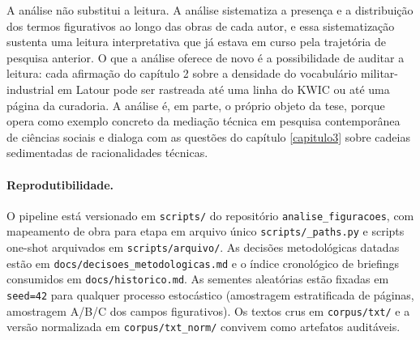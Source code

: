 A análise não substitui a leitura. A análise sistematiza a presença e a distribuição dos termos figurativos ao longo das obras de cada autor, e essa sistematização sustenta uma leitura interpretativa que já estava em curso pela trajetória de pesquisa anterior. O que a análise oferece de novo é a possibilidade de auditar a leitura: cada afirmação do capítulo 2 sobre a densidade do vocabulário militar-industrial em Latour pode ser rastreada até uma linha do KWIC ou até uma página da curadoria. A análise é, em parte, o próprio objeto da tese, porque opera como exemplo concreto da mediação técnica em pesquisa contemporânea de ciências sociais e dialoga com as questões do capítulo \ref{capitulo3} sobre cadeias sedimentadas de racionalidades técnicas.

\paragraph{Reprodutibilidade.} O pipeline está versionado em \texttt{scripts/} do repositório \texttt{analise\_figuracoes}, com mapeamento de obra para etapa em arquivo único \texttt{scripts/\_paths.py} e scripts one-shot arquivados em \texttt{scripts/arquivo/}. As decisões metodológicas datadas estão em \texttt{docs/decisoes\_metodologicas.md} e o índice cronológico de briefings consumidos em \texttt{docs/historico.md}. As sementes aleatórias estão fixadas em \texttt{seed=42} para qualquer processo estocástico (amostragem estratificada de páginas, amostragem A/B/C dos campos figurativos). Os textos crus em \texttt{corpus/txt/} e a versão normalizada em \texttt{corpus/txt\_norm/} convivem como artefatos auditáveis.
